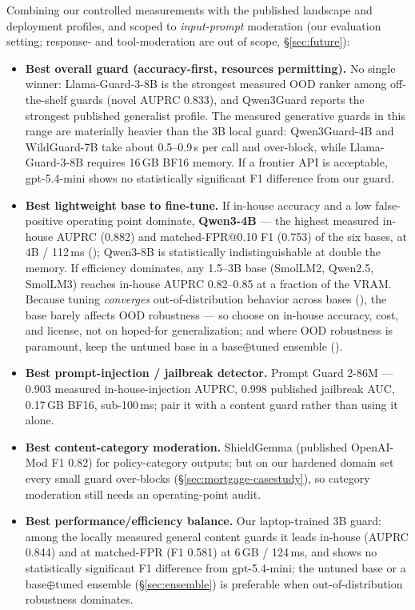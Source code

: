 Combining our controlled measurements with the published landscape and deployment profiles, and scoped to \emph{input-prompt} moderation (our evaluation setting; response- and tool-moderation are out of scope, \S\ref{sec:future}):

\begin{itemize}
  \item \textbf{Best overall guard (accuracy-first, resources permitting).} No single winner: Llama-Guard-3-8B is the strongest measured OOD ranker among off-the-shelf guards (novel AUPRC 0.833), and Qwen3Guard reports the strongest published generalist profile. The measured generative guards in this range are materially heavier than the 3B local guard: Qwen3Guard-4B and WildGuard-7B take about 0.5--0.9\,s per call and over-block, while Llama-Guard-3-8B requires 16\,GB BF16 memory. If a frontier API is acceptable, gpt-5.4-mini shows no statistically significant F1 difference from our guard.
  \item \textbf{Best lightweight base to fine-tune.} If in-house accuracy and a low false-positive operating point dominate, \textbf{Qwen3-4B} --- the highest measured in-house AUPRC (0.882) and matched-FPR@0.10 F1 (0.753) of the six bases, at 4B / 112\,ms (); Qwen3-8B is statistically indistinguishable at double the memory. If efficiency dominates, any 1.5--3B base (SmolLM2, Qwen2.5, SmolLM3) reaches in-house AUPRC 0.82--0.85 at a fraction of the VRAM. Because tuning \emph{converges} out-of-distribution behavior across bases (), the base barely affects OOD robustness --- so choose on in-house accuracy, cost, and license, not on hoped-for generalization; and where OOD robustness is paramount, keep the untuned base in a base$\oplus$tuned ensemble ().
  \item \textbf{Best prompt-injection / jailbreak detector.} Prompt Guard 2-86M --- 0.903 measured in-house-injection AUPRC, 0.998 published jailbreak AUC, 0.17\,GB BF16, sub-100\,ms; pair it with a content guard rather than using it alone.
  \item \textbf{Best content-category moderation.} ShieldGemma (published OpenAI-Mod F1 0.82) for policy-category outputs; but on our hardened domain set every small guard over-blocks (\S\ref{sec:mortgage-casestudy}), so category moderation still needs an operating-point audit.
  \item \textbf{Best performance/efficiency balance.} Our laptop-trained 3B guard: among the locally measured general content guards it leads in-house (AUPRC 0.844) and at matched-FPR (F1 0.581) at 6\,GB / 124\,ms, and shows no statistically significant F1 difference from gpt-5.4-mini; the untuned base or a base$\oplus$tuned ensemble (\S\ref{sec:ensemble}) is preferable when out-of-distribution robustness dominates.

\end{itemize}
